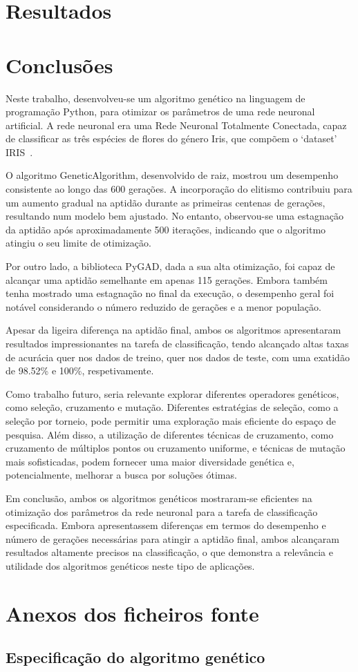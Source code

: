 \documentclass[a4paper, portuguese]{report}
\begin{document}
    \chapter{Resultados}\label{ch:results}
    


    \chapter{Conclusões}\label{ch:conclusoes}
    Neste trabalho, desenvolveu-se um algoritmo genético na linguagem de programação Python, para otimizar os parâmetros de uma rede neuronal artificial. A rede neuronal era uma Rede Neuronal Totalmente Conectada, capaz de classificar as três espécies de flores do género Iris, que compõem o `dataset' IRIS~\cite{Fisher1988}.

    O algoritmo GeneticAlgorithm, desenvolvido de raiz, mostrou um desempenho consistente ao longo das 600 gerações. A incorporação do elitismo contribuiu para um aumento gradual na aptidão durante as primeiras centenas de gerações, resultando num modelo bem ajustado. No entanto, observou-se uma estagnação da aptidão após aproximadamente 500 iterações, indicando que o algoritmo atingiu o seu limite de otimização.

    Por outro lado, a biblioteca PyGAD, dada a sua alta otimização, foi capaz de alcançar uma aptidão semelhante em apenas 115 gerações. Embora também tenha mostrado uma estagnação no final da execução, o desempenho geral foi notável considerando o número reduzido de gerações e a menor população.

    Apesar da ligeira diferença na aptidão final, ambos os algoritmos apresentaram resultados impressionantes na tarefa de classificação, tendo alcançado altas taxas de acurácia quer nos dados de treino, quer nos dados de teste, com uma exatidão de 98.52\% e 100\%, respetivamente.
    
    Como trabalho futuro, seria relevante explorar diferentes operadores genéticos, como seleção, cruzamento e mutação. Diferentes estratégias de seleção, como a seleção por torneio, pode permitir uma exploração mais eficiente do espaço de pesquisa. Além disso, a utilização de diferentes técnicas de cruzamento, como cruzamento de múltiplos pontos ou cruzamento uniforme, e técnicas de mutação mais sofisticadas, podem fornecer uma maior diversidade genética e, potencialmente, melhorar a busca por soluções ótimas.

    Em conclusão, ambos os algoritmos genéticos mostraram-se eficientes na otimização dos parâmetros da rede neuronal para a tarefa de classificação especificada. Embora apresentassem diferenças em termos do desempenho e número de gerações necessárias para atingir a aptidão final, ambos alcançaram resultados altamente precisos na classificação, o que demonstra a relevância e utilidade dos algoritmos genéticos neste tipo de aplicações.

    \appendix


    \chapter{Anexos dos ficheiros fonte}\label{ch:appendix}


    \section{Especificação do algoritmo genético}\label{sec:model_spec}
    \inputminted[breaklines]{python}{../src/genalg.py}
    
    
\end{document}
